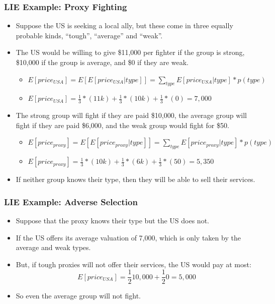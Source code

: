\documentclass[aspectratio=169, handout]{beamer}
\numberwithin{equation}{section}
\begin{document}
\begin{frame}
\frametitle{LIE Example: Proxy Fighting}
\begin{itemize}
\item  Suppose the US is seeking a local ally, but these come in three equally probable kinds, ``tough'', ``average'' and ``weak''.
\item The US would be willing to give \$11,000 per fighter if the group is strong, \$10,000 if the group is average, and \$0 if they are weak.\pause
\begin{itemize}
\item $E[price_{USA}]=E[E[price_{USA}|type]]=\sum_{type}E[price_{USA}|type]*p(type)$\pause
\item $E[price_{USA}]=\frac{1}{3}*(11k)+\frac{1}{3}*(10k)+\frac{1}{3}*(0)=7,000$\pause

\end{itemize}
\item The strong group will fight if they are paid \$10,000, the average group will fight if they are paid \$6,000, and the weak group would fight for \$50.\pause
\begin{itemize}
\item $E[price_{proxy}]=E[E[price_{proxy}|type]]=\sum_{type}E[price_{proxy}|type]*p(type)$\pause
\item $E[price_{proxy}]=\frac{1}{3}*(10k)+\frac{1}{3}*(6k)+\frac{1}{3}*(50)=5,350$\pause
\end{itemize}
\item If neither group knows their type, then they will be able to sell their services.
\end{itemize}
\end{frame}

\begin{frame}
\frametitle{LIE Example: Adverse Selection}
\begin{itemize}
\item  Suppose that the proxy knows their type but the US does not.\pause
\item If the US offers its average valuation of 7,000, which is only taken by the average and weak types.\pause
\item But, if tough proxies will not offer their services, the US would pay at most:
$$E[price_{USA}]=\frac{1}{2}10,000+\frac{1}{2}0=5,000$$
\item So even the average group will not fight.
\end{itemize}
\end{frame}
\end{document}
